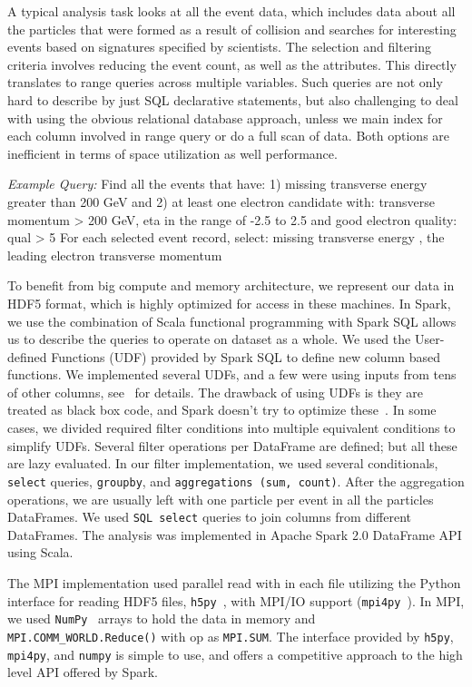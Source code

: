 \documentclass[10pt, twocolumn]{article}
\begin{document}
A typical analysis task looks at all the event data, which includes data about 
all the particles that were formed as a result of collision and searches for 
interesting events based on signatures specified by scientists. 
The selection and filtering criteria involves reducing the event count, 
as well as the attributes. This directly translates to range queries 
across multiple variables. Such queries are not only hard to 
describe by just SQL declarative statements, but also 
challenging to deal with using the obvious relational database approach, 
unless we main index for each column involved in range query or do a 
full scan of data. Both options are inefficient in terms of space utilization 
as well performance. 

\textit{Example Query:} Find all the events that have:
1) missing transverse energy greater than 200 GeV and 
2) at least one electron candidate with: transverse momentum > 200 GeV, eta in the range of -2.5 to 2.5
and good electron quality: qual > 5
For each selected event record, select: missing transverse energy , the leading electron transverse momentum

To benefit from big compute and memory architecture, we represent our data 
in HDF5 format, which is highly optimized for access in these machines. 
In Spark, we use the combination of Scala functional programming with Spark SQL 
allows us to describe the queries to operate on dataset as a whole. 
We used the User-defined Functions (UDF) provided by Spark SQL to define new column based 
functions. We implemented several UDFs, and a few were using inputs from tens of 
other columns, see~\cite{spark-hdf5-cms} for details. The drawback of using UDFs is they are treated as black box code, 
and Spark doesn't try to optimize these~\cite{spark-notes}. In some cases, we divided required filter conditions 
into multiple equivalent conditions to simplify UDFs. 
Several filter operations per DataFrame are defined; but all these are lazy evaluated. 
In our filter implementation, we used several conditionals, 
\texttt{select} queries, \texttt{groupby}, and \texttt{aggregations (sum, count)}. 
After the aggregation operations, we are usually left with one particle per event in 
all the particles DataFrames. 
We used \texttt{SQL select} queries to join columns from different DataFrames.
The analysis was implemented in Apache Spark 2.0 DataFrame API using Scala.  

The MPI implementation used parallel read with in each file utilizing the Python interface 
for reading HDF5 files, \texttt{h5py}~\cite{h5py}, with MPI/IO support (\texttt{mpi4py}~\cite{mpi4py}). 
In MPI, we used \texttt{NumPy}~\cite{numpy} arrays to hold the data in memory and 
\texttt{MPI.COMM\_WORLD.Reduce()} with op as \texttt{MPI.SUM}. 
The interface provided by \texttt{h5py}, \texttt{mpi4py}, and \texttt{numpy} 
is simple to use, and offers a competitive approach to the high level API offered by Spark. 
\end{document}
